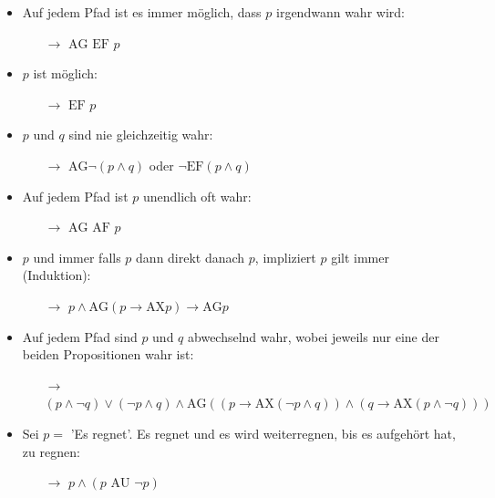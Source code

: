 \documentclass[a4paper,6pt]{article}
\begin{document}
\begin{multicols*}{3}
\begin{itemize}
    \item Auf jedem Pfad ist es immer möglich, dass $p$ irgendwann wahr wird:
    \begin{itemize}
        \item[$\rightarrow$] $\text{AG EF } p$
    \end{itemize}
    \item $p$ ist möglich:
    \begin{itemize}
        \item[$\rightarrow$] $\text{EF } p$
    \end{itemize}
    \item $p$ und $q$ sind nie gleichzeitig wahr:
    \begin{itemize}
        \item[$\rightarrow$] $\text{AG}\neg(p \wedge q)$ oder $\neg\text{EF}(p \wedge q)$
    \end{itemize}
    \item Auf jedem Pfad ist $p$ unendlich oft wahr:
    \begin{itemize}
        \item[$\rightarrow$] $\text{AG AF } p$
    \end{itemize}
    \item $p$ und immer falls $p$ dann direkt danach $p$, impliziert $p$ gilt immer (Induktion):
    \begin{itemize}
        \item[$\rightarrow$] $p \wedge \text{AG}(p \rightarrow \text{AX}p) \rightarrow \text{AG}p$
    \end{itemize}
    \item Auf jedem Pfad sind $p$ und $q$ abwechselnd wahr, wobei jeweils nur eine der beiden Propositionen wahr ist:
    \begin{itemize}
        \item[$\rightarrow$] $(p \wedge \neg q) \vee (\neg p \wedge q) \wedge \text{AG}((p \rightarrow \text{AX}(\neg p \wedge q)) \wedge (q \rightarrow \text{AX}(p \wedge \neg q)))$
    \end{itemize}
    \item Sei $p =$ 'Es regnet'. Es regnet und es wird weiterregnen, bis es aufgehört hat, zu regnen:
    \begin{itemize}
        \item[$\rightarrow$] $p \wedge (p \text{ AU } \neg p)$
    \end{itemize}
\end{itemize}


\end{multicols*}
\end{document}
